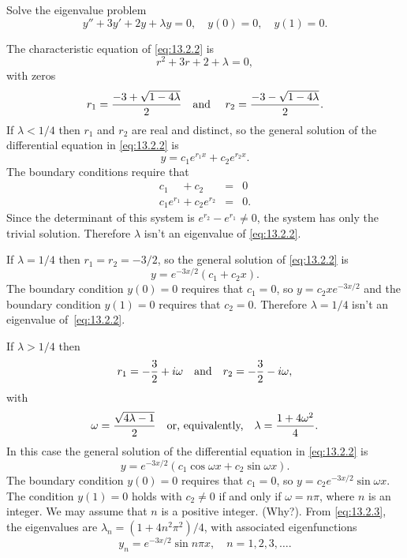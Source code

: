 \setcounter{example}{0}
\setcounter{equation}{1}
\begin{example}
  \label{example:13.2.1} \rm Solve the eigenvalue problem
  \begin{equation}
    \label{eq:13.2.2}y''+3y'+2y+\lambda y=0,\quad y(0)=0,\quad y(1)=0.
  \end{equation}
\end{example}
\setcounter{equation}{2}
\begin{examplesolution}
\solution The characteristic equation of \eqref{eq:13.2.2} is
\[
  r^{2}+3r+2+\lambda=0,
\]
with zeros
\[
  r_{1}=\frac{-3+\sqrt{1-4\lambda}}{2}\text{\quad and \quad }r_{2}=\frac{-3-\sqrt{1-4\lambda}}{2}.
\]
If $\lambda<1/4$ then $r_{1}$ and $r_{2}$ are real and distinct, so the general solution of the
differential equation in \eqref{eq:13.2.2} is
\[
  y=c_{1}e^{r_{1}x}+c_{2}e^{r_{2}x}.
\]
The boundary conditions require that
\begin{eqnarray*}
  c_{1}\phantom{e^{r_{1}}}+c_{2}\phantom{e^{r_{2}}} & = & 0 \\
  c_{1}e^{r_{1}}+c_{2}e^{r_{2}}                     & = & 0.
\end{eqnarray*}
Since the determinant of this system is $e^{r_{2}}-e^{r_{1}}\ne0$, the system has only the trivial
solution. Therefore $\lambda$ isn't an eigenvalue of \eqref{eq:13.2.2}.

If $\lambda=1/4$ then $r_{1}=r_{2}=-3/2$, so the general solution of \eqref{eq:13.2.2} is
\[
  y=e^{-3x/2}(c_{1}+c_{2}x).
\]
The boundary condition $y(0)=0$ requires that $c_{1}=0$, so $y=c_{2}xe^{-3x/2}$ and the boundary
condition $y(1)=0$ requires that $c_{2}=0$. Therefore $\lambda=1/4$ isn't an eigenvalue
of~\eqref{eq:13.2.2}.

If $\lambda>1/4$ then
\[
  r_{1}=-\frac{3}{2}+i\omega\text{\quad and\quad }r_{2}=-\frac{3}{2}-i\omega,
\]
with
\begin{equation}
  \label{eq:13.2.3}\omega=\frac{\sqrt{4\lambda-1}}{2}\text{\quad or, equivalently,\quad }\lambda=\frac{1+4\omega^{2}}{4}.
\end{equation}
In this case the general solution of the differential equation in \eqref{eq:13.2.2} is
\[
  y=e^{-3x/2}(c_{1}\cos\omega x+c_{2}\sin\omega x).
\]
The boundary condition $y(0)=0$ requires that $c_{1}=0$, so $y=c_{2}e^{-3x/2}\sin\omega x$. The condition $y(1)=0$
holds with $c_{2}\ne0$ if and only if $\omega=n\pi$, where $n$ is an integer. We may assume that $n$
is a positive integer. (Why?). From \eqref{eq:13.2.3}, the eigenvalues are
$\lambda_{n}=(1+4n^{2}\pi^{2})/4$, with associated eigenfunctions
\[
  y_{n}=e^{-3x/2}\sin n\pi x,\quad n=1,2,3,\dots.
\]
\end{examplesolution}

